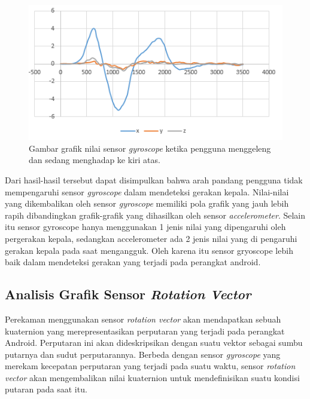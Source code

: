 \begin{figure}[htbp]
\centering
\includegraphics[scale=1]{Gambar/grafik-sensor-gyroscope-menggeleng-depan.png}
\caption{Gambar grafik nilai sensor \textit{gyroscope} ketika pengguna menggeleng dan sedang menghadap ke kiri atas.} 
\label{fig:grafik-sensor-gyroscope-menggeleng-kiri-atas}
\end{figure}

Dari hasil-hasil tersebut dapat disimpulkan bahwa arah pandang pengguna tidak mempengaruhi sensor \textit{gyroscope} dalam mendeteksi gerakan kepala. Nilai-nilai yang dikembalikan oleh sensor \textit{gyroscope} memiliki  pola grafik yang jauh lebih rapih dibandingkan grafik-grafik yang dihasilkan oleh sensor \textit{accelerometer}. Selain itu sensor gyroscope hanya menggunakan 1 jenis nilai yang dipengaruhi oleh pergerakan kepala, sedangkan accelerometer ada 2 jenis nilai yang di pengaruhi gerakan kepala pada saat mengangguk. Oleh karena itu sensor gryoscope lebih baik dalam mendeteksi gerakan yang terjadi pada perangkat android.

\subsection{Analisis Grafik Sensor \textit{Rotation Vector}}
\label{sec:analisis_grafik_sensor_rotation_vector}

Perekaman menggunakan sensor \textit{rotation vector} akan mendapatkan sebuah kuaternion yang merepresentasikan perputaran yang terjadi pada perangkat Android. Perputaran ini akan dideskripsikan dengan suatu vektor sebagai sumbu putarnya dan sudut perputarannya. Berbeda dengan sensor \textit{gyroscope} yang merekam kecepatan perputaran yang terjadi pada suatu waktu, sensor \textit{rotation vector} akan mengembalikan nilai kuaternion untuk mendefinisikan suatu kondisi putaran pada saat itu. 

